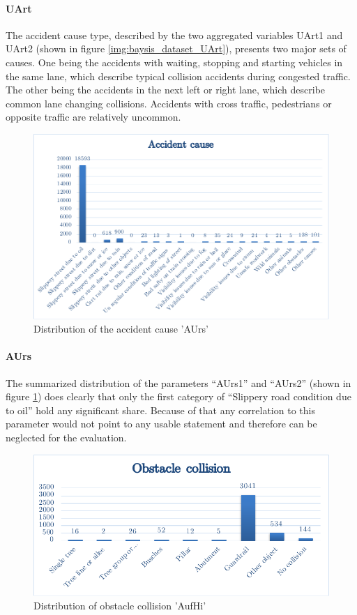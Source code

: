 \documentclass[a4paper,12pt]{report}
\begin{document}
\paragraph{UArt}
The accident cause type, described by the two aggregated variables UArt1 and UArt2 (shown in figure \ref{img:baysis_dataset_UArt}), presents two major sets of causes. One being the accidents with waiting, stopping and starting vehicles in the same lane, which describe typical collision accidents during congested traffic. The other being the accidents in the next left or right lane, which describe common lane changing collisions. Accidents with cross traffic, pedestrians or opposite traffic are relatively uncommon.

\begin{figure}[h]
	\centering
	\includegraphics[scale=0.7]{./assets/baysis_dataset_AUrs.pdf}
	\caption{Distribution of the accident cause 'AUrs'}
	\label{img:baysis_dataset_AUrs}
\end{figure}

\paragraph{AUrs}
The summarized distribution of the parameters “AUrs1” and “AUrs2” (shown in figure \ref{img:baysis_dataset_AUrs}) does clearly that only the first category of “Slippery road condition due to oil” hold any significant share. Because of that any correlation to this parameter would not point to any usable statement and therefore can be neglected for the evaluation.

\begin{figure}[]
	\centering
	\includegraphics[scale=0.6]{./assets/baysis_dataset_Aufhi.pdf}
	\caption{Distribution of obstacle collision 'AufHi'}
	\label{img:baysis_dataset_Aufhi}
\end{figure}
\end{document}
